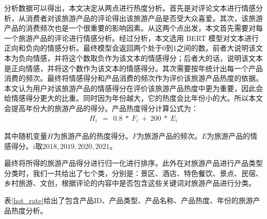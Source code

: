 \documentclass[bwprint]{gmcmthesis}
\begin{document}
分析数据可以得出，本文决定从两点进行热度分析。首先是对评论文本进行情感分析，从消费者对该旅游产品的评论得出该旅游产品是否受大众喜爱。其次，该旅游产品的消费频次也是一个很重要的影响因素。从这两个点出发，本文首先需要对每一个旅游产品的评论进行情感分析。经过分析，本文选用 BERT 模型对文本进行正向和负向的情感分析。最终模型会返回两个处于0到1之间的数。前者大说明该文本为负向情感，并将这个数取负作为该文本的情感得分；后者大的话，说明该文本是正向情感，并将这个数作为该文本的情感得分。其次需要按年统计出每一个产品消费的频次。最终将情感得分和产品消费的频次作为评价该旅游产品热度的依据。本文认为用户对该旅游产品的情感得分在评价该旅游产品热度中更为重要，因此会给情感得分更大的比重。同时因为年份越大，它的热度会比年份小的大。所以本文会提高年份大的旅游产品的得分。产品热度得分计算公式为：
  \begin{gather}
	H_i~~=~~0.8~*~F_i ~+ ~200 ~*~ E_i
\end{gather}

其中随机变量$H$为旅游产品的热度得分。$F$为旅游产品的频次。$E$为旅游产品的情感得分。$i$取$2018,2019,2020,2021$。


最终将所得的旅游产品得分进行归一化进行排序。此外在对旅游产品进行产品类型分类时，我们一共给出了七个类，分别是：景区、酒店、特色餐饮、景点、民宿、乡村旅游、文创，根据评论的内容中是否包含这些关键词对旅游产品进行分类。


表\ref{hot_rate}给出了包含产品ID、产品类型、产品名称、产品热度、年份的旅游产品热度分析。
\end{document}
